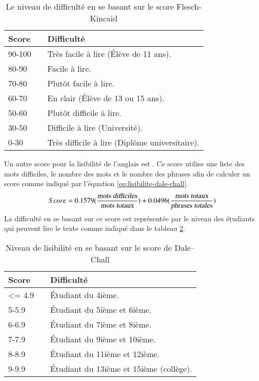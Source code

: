\documentclass{KodeBook}
\begin{document}
\begin{table}[!ht]
	\centering
	\begin{tabular}{p{}lp{}}
		\hline\hline
		\textbf{Score} && \textbf{Difficulté}\\
		\hline
		90-100 && Très facile à lire (Élève de 11 ans). \\
		80-90 && Facile à lire. \\
		70-80 && Plutôt facile à lire.\\
		60-70 && En clair (Élève de 13 ou 15 ans). \\
		50-60 && Plutôt difficile à lire. \\
		30-50 && Difficile à lire (Université). \\
		0-30 && Très difficile à lire (Diplôme universitaire). \\
		\hline\hline
	\end{tabular}
    \caption{Le niveau de difficulté en se basant sur le score Flesch-Kincaid}
    \label{tab:lisibilite-flesch-kincaid}
\end{table}

Un autre score pour la lisibilité de l'anglais est . 
Ce score utilise une liste des mots difficiles, le nombre des mots et le nombre des phrases afin de calculer un score comme indiqué par l'équation \ref{eq:lisibilite-dale-chall}.
\begin{equation}\label{eq:lisibilite-dale-chall}
Score = 0.1579 (\frac{\text{\slshape mots difficiles}}{\text{\slshape mots totaux}})
+ 0.0496 (\frac{\text{\slshape mots totaux}}{\text{\slshape phrases totales}})
\end{equation}
La difficulté en se basant sur ce score est représentée par le niveau des étudiants qui peuvent lire le texte comme indiqué dans le tableau \ref{tab:lisibilite-dale-chall}. 

\begin{table}[!ht]
	\centering
	\begin{tabular}{p{}lp{}}
		\hline\hline
		\textbf{Score} && \textbf{Difficulté}\\
		\hline
		\textless= 4.9 && Étudiant du 4ième. \\
		5-5.9 && Étudiant du 5ième et 6ième. \\
		6-6.9 && Étudiant du 7ième et 8ième.\\
		7-7.9 && Étudiant du 9ième et 10ième. \\
		8-8.9 && Étudiant du 11ième et 12ième. \\
		9-9.9 && Étudiant du 13ième et 15ième (collège). \\
		\hline\hline
	\end{tabular}
	\caption{Niveau de lisibilité en se basant sur le score de Dale–Chall}
	\label{tab:lisibilite-dale-chall}
\end{table}
\end{document}
